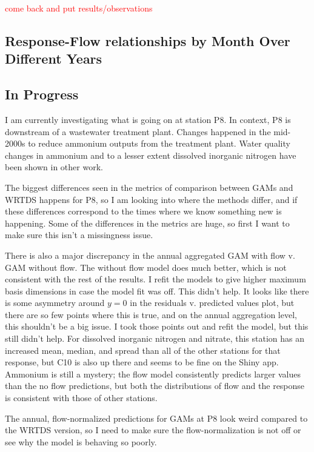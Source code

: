 \documentclass[12pt]{amsart}
\begin{document}
\textcolor{red}{come back and put results/observations}


\subsection{Response-Flow relationships by Month Over Different Years}

\subsection{In Progress}

I am currently investigating what is going on at station P8. In context, P8 is downstream of a wastewater treatment plant. Changes happened in the mid-2000s to reduce ammonium outputs from the treatment plant. Water quality changes in ammonium and to a lesser extent dissolved inorganic nitrogen have been shown in other work.

The biggest differences seen in the metrics of comparison between GAMs and WRTDS happens for P8, so I am looking into where the methods differ, and if these differences correspond to the times where we know something new is happening. Some of the differences in the metrics are huge, so first I want to make sure this isn't a missingness issue. 

There is also a major discrepancy in the annual aggregated GAM with flow v. GAM without flow. The without flow model does much better, which is not consistent with the rest of the results. I refit the models to give higher maximum basis dimensions in case the model fit was off. This didn't help. It looks like there is some asymmetry around $y=0$ in the residuals v. predicted values plot, but there are so few points where this is true, and on the annual aggregation level, this shouldn't be a big issue. I took those points out and refit the model, but this still didn't help. For dissolved inorganic nitrogen and nitrate, this station has an increased mean, median, and spread than all of the other stations for that response, but C10 is also up there and seems to be fine on the Shiny app. Ammonium is still a mystery; the flow model consistently predicts larger values than the no flow predictions, but both the distributions of flow and the response is consistent with those of other stations.

The annual, flow-normalized predictions for GAMs at P8 look weird compared to the WRTDS version, so I need to make sure the flow-normalization is not off or see why the model is behaving so poorly.
\end{document}
